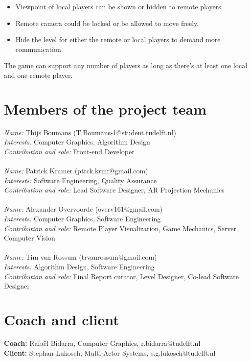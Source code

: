 \documentclass[]{article}
\begin{document}
\begin{itemize}
    \item Viewpoint of local players can be shown or hidden to remote players.
    \item Remote camera could be locked or be allowed to move freely.
    \item Hide the level for either the remote or local players to demand more
    communication.
\end{itemize}
The game can support any number of players as long as there's at least one local
and one remote player.

\section*{Members of the project team}
\textit{Name:} Thijs Boumans (T.Boumans-1@student.tudelft.nl)\\
\textit{Interests:} Computer Graphics, Algorithm Design \\
\textit{Contribution and role:} Front-end Developer \\
\\
\textit{Name:} Patrick Kramer (ptrck.krmr@gmail.com) \\
\textit{Interests:} Software Engineering, Quality Assurance \\
\textit{Contribution and role:} Lead Software Designer, AR Projection Mechanics \\
\\
\textit{Name:} Alexander Overvoorde (overv161@gmail.com)\\
\textit{Interests:} Computer Graphics, Software Engineering\\
\textit{Contribution and role:} Remote Player Visualization, Game Mechanics, Server Computer Vision\\
\\
\textit{Name:} Tim van Rossum (trvanrossum@gmail.com)\\
\textit{Interests:} Algorithm Design, Software Engineering \\
\textit{Contribution and role:} Final Report curator, Level Designer, Co-lead Software Designer 

\section*{Coach and client}
\textbf{Coach:} Rafa\"el Bidarra, Computer Graphics, r.bidarra@tudelft.nl\\
\textbf{Client:} Stephan Lukosch, Multi-Actor Systems, s.g.lukosch@tudelft.nl
\end{document}
